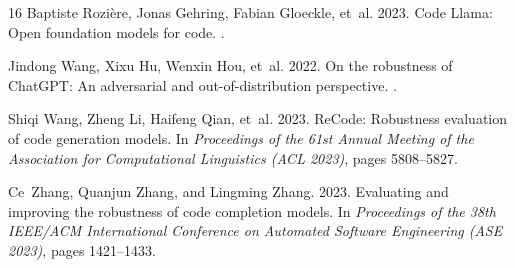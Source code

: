 \documentclass[11pt,twocolumn]{article}
\begin{document}
{\begin{thebibliography}{16}
Baptiste Rozi{\`e}re, Jonas Gehring, Fabian Gloeckle, et~al. 2023.
\newblock Code Llama: Open foundation models for code.
.

Jindong Wang, Xixu Hu, Wenxin Hou, et~al. 2022.
\newblock On the robustness of ChatGPT: An adversarial and out-of-distribution perspective.
.

Shiqi Wang, Zheng Li, Haifeng Qian, et~al. 2023.
\newblock ReCode: Robustness evaluation of code generation models.
\newblock In {\em Proceedings of the 61st Annual Meeting of the Association for Computational Linguistics (ACL 2023)}, pages 5808--5827.

Ce~Zhang, Quanjun Zhang, and Lingming Zhang. 2023.
\newblock Evaluating and improving the robustness of code completion models.
\newblock In {\em Proceedings of the 38th IEEE/ACM International Conference on Automated Software Engineering (ASE 2023)}, pages 1421--1433.

\end{thebibliography}
}
\end{document}
